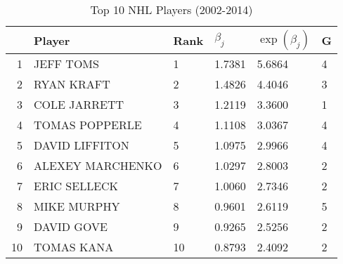 \begin{table}[ht]
\centering
\begin{tabular}{rlllll}
  \hline
 & Player & Rank & $\beta_j$ & $\exp(\beta_j)$ & G \\ 
  \hline
1 & JEFF TOMS & 1 & 1.7381 & 5.6864 & 4 \\ 
  2 & RYAN KRAFT & 2 & 1.4826 & 4.4046 & 3 \\ 
  3 & COLE JARRETT & 3 & 1.2119 & 3.3600 & 1 \\ 
  4 & TOMAS POPPERLE & 4 & 1.1108 & 3.0367 & 4 \\ 
  5 & DAVID LIFFITON & 5 & 1.0975 & 2.9966 & 4 \\ 
  6 & ALEXEY MARCHENKO & 6 & 1.0297 & 2.8003 & 2 \\ 
  7 & ERIC SELLECK & 7 & 1.0060 & 2.7346 & 2 \\ 
  8 & MIKE MURPHY & 8 & 0.9601 & 2.6119 & 5 \\ 
  9 & DAVID GOVE & 9 & 0.9265 & 2.5256 & 2 \\ 
  10 & TOMAS KANA & 10 & 0.8793 & 2.4092 & 2 \\ 
   \hline
\end{tabular}
\caption{Top 10 NHL Players (2002-2014)} 
\label{tab:best10}
\end{table}
